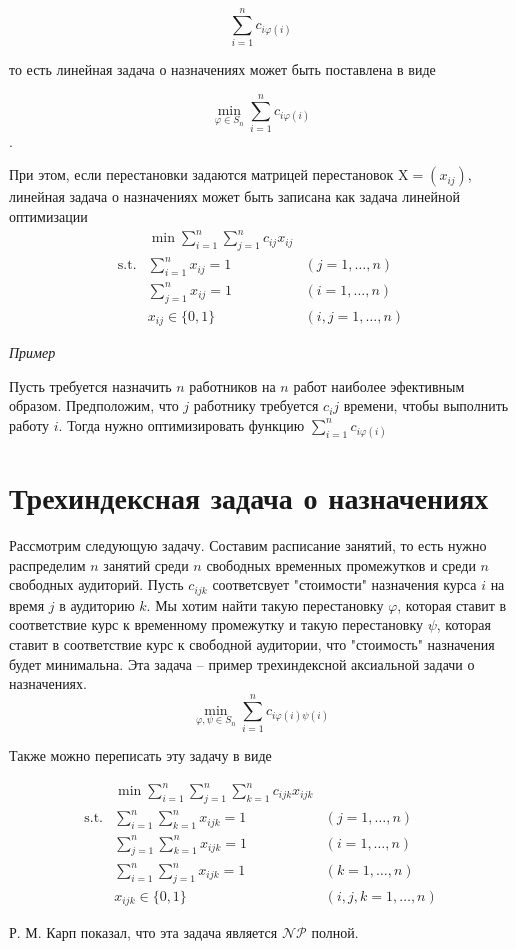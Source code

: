 \documentclass[10pt,a4paper]{article}
\begin{document}
\[
  \sum^n_{i = 1} c_{i \varphi (i)}
\]

то есть линейная задача о назначениях может быть поставлена в виде

\[
  \min_{\varphi \in S_n} \sum^n_{i = 1} c_{i \varphi (i)}
\].

При этом, если перестановки задаются матрицей перестановок $\mathrm{X} = (x_{ij})$,
линейная задача о назначениях может быть записана как задача линейной оптимизации
\begin{eqnarray*}
  & \min \displaystyle \sum^n_{i = 1} \displaystyle \sum^n_{j = 1} c_{ij} x_{ij} \\
  \text{s.t.} & \displaystyle \sum^n_{i = 1} x_{ij} = 1 &(j = 1, \ldots, n) \\
  &\displaystyle \sum^n_{j = 1} x_{ij} = 1 &(i = 1, \ldots, n) \\
  & x_{ij} \in \{ 0, 1 \}
  &(i,j = 1, \ldots, n)
\end{eqnarray*}

\textit{Пример}

Пусть требуется назначить $n$ работников на $n$ работ наиболее эфективным образом.
Предположим, что $j$ работнику требуется $c_ij$ времени, чтобы выполнить работу
$i$. Тогда нужно оптимизировать функцию
$\sum^n_{i = 1} c_{i \varphi(i)} $

\section{Трехиндексная задача о назначениях}

Рассмотрим следующую задачу.
Составим расписание занятий, то есть нужно распределим $n$ занятий
среди $n$ свободных временных промежутков и среди $n$ свободных аудиторий.
Пусть $c_{ijk}$ соответсвует "стоимости" назначения курса $i$ на время $j$
в аудиторию $k$. Мы хотим найти такую перестановку $\varphi$, которая ставит
в соответствие курс к временному промежутку и такую перестановку $\psi$,
которая ставит
в соответствие курс к свободной аудитории, что "стоимость" назначения будет
минимальна. Эта задача -- пример трехиндексной аксиальной задачи о назначениях.
\[
 \min_{\varphi , \psi \in S_n} \sum^{n}_{i = 1} c_{i \varphi (i) \psi (i) }
\]

Также можно переписать эту задачу в виде

\begin{eqnarray*}
  & \min \displaystyle \sum^n_{i = 1} \displaystyle \sum^n_{j = 1} \displaystyle \sum^n_{k = 1}
  c_{ijk} x_{ijk} \\
  \text{s.t.}
  &\displaystyle \sum^n_{i = 1} \displaystyle \sum^n_{k = 1} x_{ijk} = 1  &(j = 1, \ldots, n) \\
  &\displaystyle \sum^n_{j = 1} \displaystyle \sum^n_{k = 1} x_{ijk} = 1  &(i = 1, \ldots, n) \\
  &\displaystyle \sum^n_{i = 1} \displaystyle \sum^n_{j = 1} x_{ijk} = 1  &(k = 1, \ldots, n) \\
  & x_{ijk} \in \{ 0, 1 \} &(i,j,k = 1, \ldots, n)
\end{eqnarray*}

Р. М. Карп показал, что эта задача является $\mathcal{NP}$ полной. 
\end{document}
